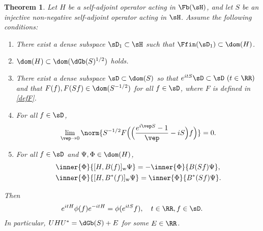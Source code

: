 \documentclass[12pt,draft]{article}
\theoremstyle{plain}
\newtheorem{theorem}{Theorem}[section]
\numberwithin{equation}{section}
\theoremstyle{remark}
\begin{document}
\begin{theorem}\label{diag prop}
Let $H$ be a self-adjoint operator acting in $\Fb(\sH)$, and let $S$ be an injective non-negative self-adjoint
operator acting in $\sH$. 
Assume the following conditions:
\begin{enumerate}
\item[(i)] There exist a dense subspace $\sD_1\subset \sH$ such that $\Ffin(\sD_1)\subset \dom(H)$.
\item[(ii)] $\dom(H) \subset \dom(\dGb(S)^{1/2})$ holds.
\item[(iii)] There exist a dense subspace $\sD\subset \dom(S)$ so that 
$e^{itS}\sD \subset \sD\ (t\in\RR)$ and that $F(f),F(Sf)\in\dom(S^{-1/2})$ for all $f\in \sD$, where $F$ is defined in \eqref{defF}.
\item[(iv)] For all $f\in\sD$, 
  \begin{align*}
   \lim_{\vep\to 0}\norm{S^{-1/2}F\Big(\Big(\frac{e^{i\vep S}-1}{\vep} -iS\Big)f\Big)} =0.    
  \end{align*}
\item[(v)] For all $f\in\sD$ and $ \Psi,\Phi\in\dom(H)$,
\begin{align}
& \inner{\Phi}{[H,B(f)]_\mathrm{w}\Psi} = -\inner{\Phi}{B(Sf)\Psi},   \label{comm1}\\ 
& \inner{\Phi}{[H,B^*(f)]_\mathrm{w}\Psi} = \inner{\Phi}{B^*(Sf)\Psi}. \label{comm2}
\end{align}
\end{enumerate}
Then
\begin{align}
  e^{itH} \phi(f) e^{-itH} = \phi(e^{itS}f), \quad 
  t\in\RR, f\in\sD. \label{transH}
\end{align}
In particular, $UHU^* = \dGb(S)+E$ for some $E\in\RR$.
\end{theorem}
\end{document}
